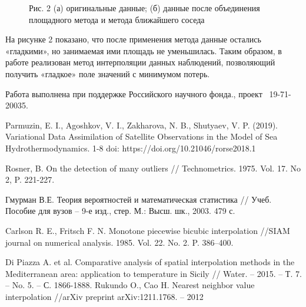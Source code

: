 \begin{figure}[htb]
  \centering
  
  \begin{center}
  \end{center}
  \caption{Рис. 2 (а) оригинальные данные; (б) данные после объединения площадного метода и метода ближайшего соседа }\label{fig:example}
\end{figure}

На рисунке 2 показано, что после применения метода данные остались «гладкими», но занимаемая ими площадь не уменьшилась. 
Таким образом, в работе реализован метод интерполяции данных наблюдений, позволяющий получить «гладкое» поле значений с минимумом потерь.


Работа выполнена при поддержке Российского научного фонда., проект \textnumero~19-71-20035.
%



\begin{thebibliography}{9} %
 Parmuzin, E. I., Agoshkov, V. I., Zakharova, N. B., Shutyaev, V. P. (2019). Variational Data Assimilation of Satellite Observations in the Model of Sea Hydrothermodynamics. 1-8 doi: https://doi.org/10.21046/rorse2018.1

 Rosner, B. On the detection of many outliers // Technometrics. 1975. Vol. 17. No 2, P. 221-227.

 Гмурман В.Е. Теория вероятностей и математическая статистика // Учеб. Пособие для вузов – 9-е изд., стер. М.: Высш. шк., 2003. 479 с.

 Carlson R. E., Fritsch F. N. Monotone piecewise bicubic interpolation //SIAM journal on numerical analysis.  1985.  Vol. 22. No. 2. P. 386--400.

 Di Piazza A. et al. Comparative analysis of spatial interpolation methods in the Mediterranean area: application to temperature in Sicily // Water. – 2015. – Т. 7. – No. 5. – С. 1866-1888.
Rukundo O., Cao H. Nearest neighbor value interpolation //arXiv preprint arXiv:1211.1768. – 2012


\end{thebibliography}





%

